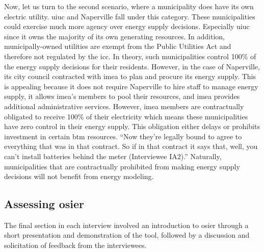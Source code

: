 Now, let us turn to the second scenario, where a municipality does have its own
electric utility. \ac{uiuc} and Naperville fall under this category. These
municipalities could exercise much more agency over energy supply decisions.
Especially \ac{uiuc} since it owns the majority of its own generating resources.
In addition, municipally-owned utilities are exempt from the Public Utilities
Act and therefore not regulated by the \ac{icc}. In theory, such municipalities
control 100\% of the energy supply decisions for their residents. However, in
the case of Naperville, its city council contracted with \ac{imea} to plan and
procure its energy supply. This is appealing because it does not require
Naperville to hire staff to manage energy supply, it allows \ac{imea}'s members
to pool their resources, and \ac{imea} provides additional administrative
services. However, \ac{imea} members are contractually obligated to receive
100\% of their electricity which means these municipalities have zero control in
their energy supply. This obligation either delays or prohibits investment in
certain \ac{btm} resources. ``Now they're legally bound to agree to everything
that was in that contract. So if in that contract it says that, well, you can't
install batteries behind the meter (Interviewee IA2).'' Naturally,
municipalities that are contractually prohibited from making energy supply
decisions will not benefit from energy modeling.

\subsection{Assessing \ac{osier}}
\label{section:assess-osier} 

The final section in each interview involved an introduction to \ac{osier}
through a short presentation and demonstration of the tool, followed by a
discussion and solicitation of feedback from the interviewees. 

